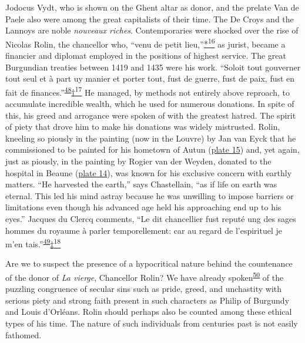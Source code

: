 Jodocus Vydt, who is shown on the Ghent altar as donor, and the prelate
Van de Paele also were among the great capitalists of their time. The De
Croys and the Lannoys are noble \emph{nouveaux riches}. Contemporaries
were shocked over the rise of Nicolas Rolin,
\protect\hypertarget{20_ILLUSTRATIONS_FOLLOW_PAGE.xhtmlux5cux23page_317}{}{}the
chancellor who, ``venu de petit
lieu,''\protect\hypertarget{20_ILLUSTRATIONS_FOLLOW_PAGE.xhtmlux5cux23id_2683}{\protect\hyperlink{23_NOTES.xhtmlux5cux23id_2684}{*\textsuperscript{16}}}
as jurist, became a financier and diplomat employed in the positions of
highest service. The great Burgundian treaties between 1419 and 1435
were his work. ``Soloit tout gouverner tout seul et à part uy manier et
porter tout, fust de guerre, fust de paix, fust en fait de
finances.''\textsuperscript{\protect\hypertarget{20_ILLUSTRATIONS_FOLLOW_PAGE.xhtmlux5cux23id_377}{\protect\hyperlink{23_NOTES.xhtmlux5cux23id_378}{48}}}\protect\hypertarget{20_ILLUSTRATIONS_FOLLOW_PAGE.xhtmlux5cux23id_2685}{\protect\hyperlink{23_NOTES.xhtmlux5cux23id_2686}{†\textsuperscript{17}}}
He managed, by methods not entirely above reproach, to accumulate
incredible wealth, which he used for numerous donations. In spite of
this, his greed and arrogance were spoken of with the greatest hatred.
The spirit of piety that drove him to make his donations was widely
mistrusted. Rolin, kneeling so piously in the painting (now in the
Louvre) by Jan van Eyck that he commissioned to be painted for his
hometown of Autun
(\protect\hyperlink{20_ILLUSTRATIONS_FOLLOW_PAGE.xhtmlux5cux23id_15}{plate
15}) and, yet again, just as piously, in the painting by Rogier van der
Weyden, donated to the hospital in Beaune
(\protect\hyperlink{20_ILLUSTRATIONS_FOLLOW_PAGE.xhtmlux5cux23id_2298}{plate
14}), was known for his exclusive concern with earthly matters. ``He
harvested the earth,'' says Chastellain, ``as if life on earth was
eternal. This led his mind astray because he was unwilling to impose
barriers or limitations even though his advanced age held his
approaching end up to his eyes.'' Jacques du Clercq comments, ``Le dit
chancellier fust reputé ung des sages hommes du royaume à parler
temporellement: car au regard de l'espirituel je m'en
tais.''\textsuperscript{\protect\hypertarget{20_ILLUSTRATIONS_FOLLOW_PAGE.xhtmlux5cux23id_375}{\protect\hyperlink{23_NOTES.xhtmlux5cux23id_376}{49}}}\protect\hypertarget{20_ILLUSTRATIONS_FOLLOW_PAGE.xhtmlux5cux23id_2687}{\protect\hyperlink{23_NOTES.xhtmlux5cux23id_2688}{‡\textsuperscript{18}}}

Are we to suspect the presence of a hypocritical nature behind the
countenance of the donor of \emph{La vierge}, Chancellor Rolin? We have
already
spoken\textsuperscript{\protect\hypertarget{20_ILLUSTRATIONS_FOLLOW_PAGE.xhtmlux5cux23id_373}{\protect\hyperlink{23_NOTES.xhtmlux5cux23id_374}{50}}}
of the puzzling congruence of secular sins such as pride, greed, and
unchastity with serious piety and strong faith present in such
characters as Philip of Burgundy and Louis d'Orléans. Rolin should
perhaps also be counted among these ethical types of his time. The
nature of such individuals from centuries past is not easily fathomed.

